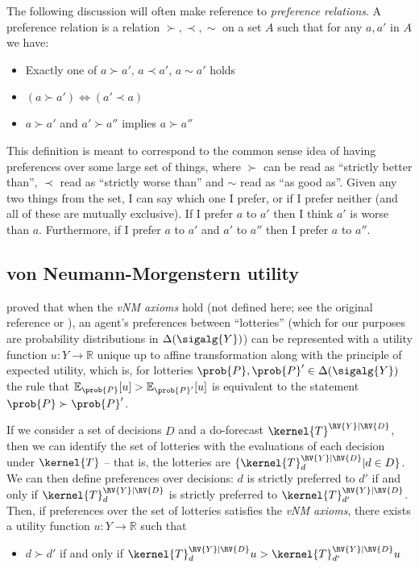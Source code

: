 The following discussion will often make reference to \emph{preference relations}. A preference relation is a relation $\succ,\prec,\sim$ on a set $A$ such that for any $a,a'$ in $A$ we have:
\begin{itemize}
    \item Exactly one of $a\succ a'$, $a\prec a'$, $a\sim a'$ holds
    \item $(a\succ a')\iff(a'\prec a)$
    \item $a\succ a'$ and $a'\succ a''$ implies $a\succ a''$
\end{itemize}

This definition is meant to correspond to the common sense idea of having preferences over some large set of things, where $\succ$ can be read as ``strictly better than'', $\prec$ read as ``strictly worse than'' and $\sim$ read as ``as good as''. Given any two things from the set, I can say which one I prefer, or if I prefer neither (and all of these are mutually exclusive). If I prefer $a$ to $a'$ then I think $a'$ is worse than $a$. Furthermore, if I prefer $a$ to $a'$ and $a'$ to $a''$ then I prefer $a$ to $a''$.

\subsection{von Neumann-Morgenstern utility}

\citet{von_neumann_theory_1944} proved that when the \emph{vNM axioms} hold (not defined here; see the original reference or \citet{steele_decision_2020}), an agent's preferences between ``lotteries'' (which for our purposes are probability distributions in $\Delta(\sigalg{Y})$) can be represented with a utility function $u:Y\to \mathbb{R}$ unique up to affine transformation along with the principle of expected utility, which is, for lotteries $\prob{P},\prob{P}'\in\Delta(\sigalg{Y})$ the rule that $\mathbb{E}_{\prob{P}}[u]> \mathbb{E}_{\prob{P}'}[u]$ is equivalent to the statement $\prob{P} \succ \prob{P}'$.

If we consider a set of decisions $D$ and a do-forecast $\kernel{T}^{\RV{Y}|\RV{{D}}}$, then we can identify the set of lotteries with the evaluations of each decision under $\kernel{T}$ -- that is, the lotteries are $\{\kernel{T}^{\RV{Y}|\RV{D}}_d|d\in D\}$. We can then define preferences over decisions: $d$ is strictly preferred to $d'$ if and only if $\kernel{T}_{d}^{\RV{Y}|\RV{D}}$ is strictly preferred to $\kernel{T}_{d'}^{\RV{Y}|\RV{D}}$. Then, if preferences over the set of lotteries satisfies the \emph{vNM axioms}, there exists a utility function $u:Y\to \mathbb{R}$ such that
\begin{itemize}
    \item $d\succ d'$ if and only if $\kernel{T}_d^{\RV{Y}|\RV{D}}u>\kernel{T}_{d'}^{\RV{Y}|\RV{D}}u$
\end{itemize}

